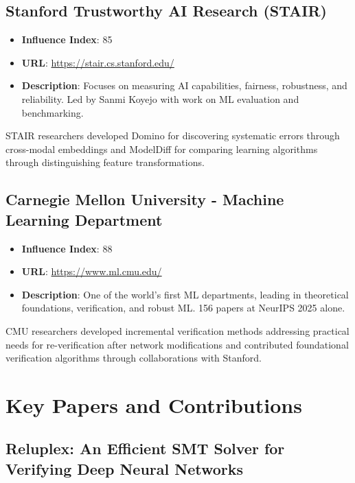 \documentclass[12pt,a4paper]{article}
\begin{document}
\subsection{Stanford Trustworthy AI Research (STAIR)}

\begin{itemize}
\item \textbf{Influence Index}: 85
\item \textbf{URL}: \url{https://stair.cs.stanford.edu/}
\item \textbf{Description}: Focuses on measuring AI capabilities, fairness, robustness, and reliability. Led by Sanmi Koyejo with work on ML evaluation and benchmarking.
\end{itemize}

STAIR researchers developed Domino for discovering systematic errors through cross-modal embeddings and ModelDiff for comparing learning algorithms through distinguishing feature transformations.

\subsection{Carnegie Mellon University - Machine Learning Department}

\begin{itemize}
\item \textbf{Influence Index}: 88
\item \textbf{URL}: \url{https://www.ml.cmu.edu/}
\item \textbf{Description}: One of the world's first ML departments, leading in theoretical foundations, verification, and robust ML. 156 papers at NeurIPS 2025 alone.
\end{itemize}

CMU researchers developed incremental verification methods addressing practical needs for re-verification after network modifications and contributed foundational verification algorithms through collaborations with Stanford.

\section{Key Papers and Contributions}

\subsection{Reluplex: An Efficient SMT Solver for Verifying Deep Neural Networks}
\end{document}
